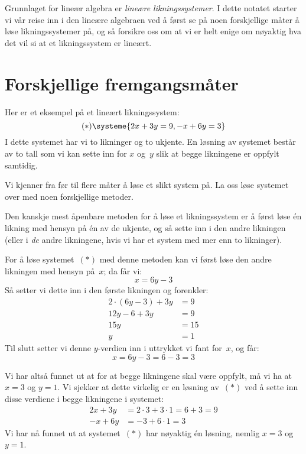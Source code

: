 
\usepackage{tikz}




\noindent%
Grunnlaget for lineær algebra er \emph{lineære liknings\-systemer}.  I
dette notatet starter vi vår reise inn i den lineære algebraen ved å
først se på noen forskjellige måter å løse likningssystemer på, og så
forsikre oss om at vi er helt enige om nøyaktig hva det vil si at et
likningssystem er lineært.

\section*{Forskjellige fremgangsmåter}

Her er et eksempel på et lineært likningssystem:
\[
(\ast)
\systeme{
2x + 3y = 9,
-x + 6y = 3
}
\]
I dette systemet har vi to likninger og to ukjente.
En løsning av systemet består av to tall som vi kan sette inn
for $x$ og~$y$ slik at begge likningene er oppfylt samtidig.

Vi kjenner fra før til flere måter å løse et slikt system på.  La oss
løse systemet over med noen forskjellige metoder.

\begin{ex}
Den kanskje mest åpenbare metoden for å løse et likningssystem er å
først løse én likning med hensyn på én av de ukjente, og så sette inn
i den andre likningen (eller i \emph{de} andre likningene, hvis vi har
et system med mer enn to likninger).

For å løse systemet~$(\ast)$ med denne metoden kan vi først løse den
andre likningen med hensyn på~$x$; da får vi:
\[
x = 6y - 3
\]
Så setter vi dette inn i den første likningen og forenkler:
\begin{align*}
2 \cdot (6y - 3) + 3y &= 9 \\
12y - 6 + 3y &= 9 \\
15y &= 15 \\
y &= 1
\end{align*}
Til slutt setter vi denne $y$-verdien inn i uttrykket vi fant for~$x$,
og får:
\[
x = 6y - 3 = 6 - 3 = 3
\]

Vi har altså funnet ut at for at begge likningene skal være oppfylt,
må vi ha at $x = 3$ og $y = 1$.  Vi sjekker at dette virkelig er en
løsning av~$(\ast)$ ved å sette inn disse verdiene i begge likningene
i systemet:
\begin{align*}
2x + 3y &= 2 \cdot 3 + 3 \cdot 1 = 6 + 3 = 9 \\
-x + 6y &= -3 + 6 \cdot 1 = 3
\end{align*}
Vi har nå funnet ut at systemet~$(\ast)$ har nøyaktig én løsning,
nemlig $x = 3$ og $y = 1$.
\end{ex}

